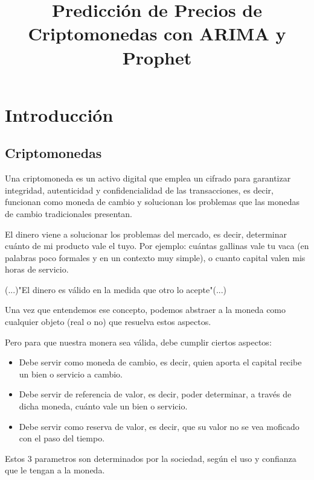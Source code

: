 \documentclass[a4paper,10pt]{article}
\title{Predicción de Precios de Criptomonedas con ARIMA y Prophet}
\author{}
\begin{document}
\maketitle

\begin{abstract}

\end{abstract}

\tableofcontents


\section{Introducción}

\subsection{Criptomonedas}

 Una criptomoneda es un activo digital que emplea un cifrado para garantizar integridad, autenticidad y confidencialidad de las transacciones, es decir, funcionan como moneda de cambio y solucionan los problemas que las monedas de cambio tradicionales presentan.

 El dinero viene a solucionar los problemas del mercado, es decir, determinar cuánto de mi producto vale el tuyo. Por ejemplo: cuántas gallinas vale tu vaca (en palabras poco formales y en un contexto muy simple), o cuanto capital valen mis horas de servicio.

(...)"El dinero es válido en la medida que otro lo acepte"(...)

Una vez que entendemos ese concepto, podemos abstraer a la moneda como cualquier objeto (real o no) que resuelva estos aspectos.

Pero para que nuestra monera sea válida, debe cumplir ciertos aspectos:

\begin{itemize}
 \item Debe servir como moneda de cambio, es decir, quien aporta el capital recibe un bien o servicio a cambio.
 \item Debe servir de referencia de valor, es decir, poder determinar, a través de dicha moneda, cuánto vale un bien o servicio.
 \item Debe servir como reserva de valor, es decir, que su valor no se vea moficado con el paso del tiempo.
\end{itemize}

Estos 3 parametros son determinados por la sociedad, según el uso y confianza que le tengan a la moneda.
\end{document}
